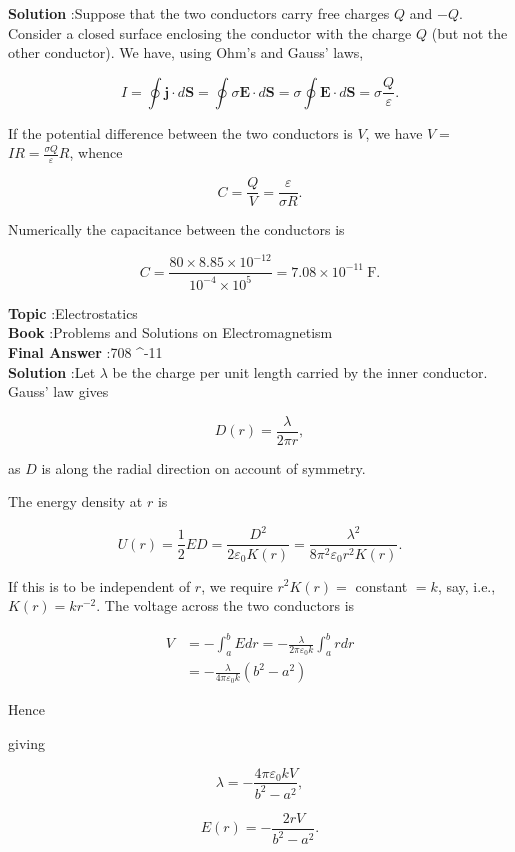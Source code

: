 \documentclass[10pt]{article}
\begin{document}
\textbf{Solution} :Suppose that the two conductors carry free charges $Q$ and $-Q$. Consider a closed surface enclosing the conductor with the charge $Q$ (but not the other conductor). We have, using Ohm's and Gauss' laws,

$$
I=\oint \mathbf{j} \cdot d \mathbf{S}=\oint \sigma \mathbf{E} \cdot d \mathbf{S}=\sigma \oint \mathbf{E} \cdot d \mathbf{S}=\sigma \frac{Q}{\varepsilon} .
$$

If the potential difference between the two conductors is $V$, we have $V=$ $I R=\frac{\sigma Q}{\varepsilon} R$, whence

$$
C=\frac{Q}{V}=\frac{\varepsilon}{\sigma R} .
$$

Numerically the capacitance between the conductors is

$$
C=\frac{80 \times 8.85 \times 10^{-12}}{10^{-4} \times 10^{5}}=7.08 \times 10^{-11} \mathrm{~F} .
$$


\textbf{Topic} :Electrostatics\\
\textbf{Book} :Problems and Solutions on Electromagnetism\\
\textbf{Final Answer} :708 ^{-11} \\


\textbf{Solution} :Let $\lambda$ be the charge per unit length carried by the inner conductor. Gauss' law gives

$$
D(r)=\frac{\lambda}{2 \pi r},
$$

as $D$ is along the radial direction on account of symmetry.

The energy density at $r$ is

$$
U(r)=\frac{1}{2} E D=\frac{D^{2}}{2 \varepsilon_{0} K(r)}=\frac{\lambda^{2}}{8 \pi^{2} \varepsilon_{0} r^{2} K(r)} .
$$

If this is to be independent of $r$, we require $r^{2} K(r)=$ constant $=k$, say, i.e., $K(r)=k r^{-2}$. The voltage across the two conductors is

$$
\begin{aligned}
V &=-\int_{a}^{b} E d r=-\frac{\lambda}{2 \pi \varepsilon_{0} k} \int_{a}^{b} r d r \\
&=-\frac{\lambda}{4 \pi \varepsilon_{0} k}\left(b^{2}-a^{2}\right)
\end{aligned}
$$

Hence

giving

$$
\lambda=-\frac{4 \pi \varepsilon_{0} k V}{b^{2}-a^{2}},
$$

$$
E(r)=-\frac{2 r V}{b^{2}-a^{2}} .
$$
\end{document}
